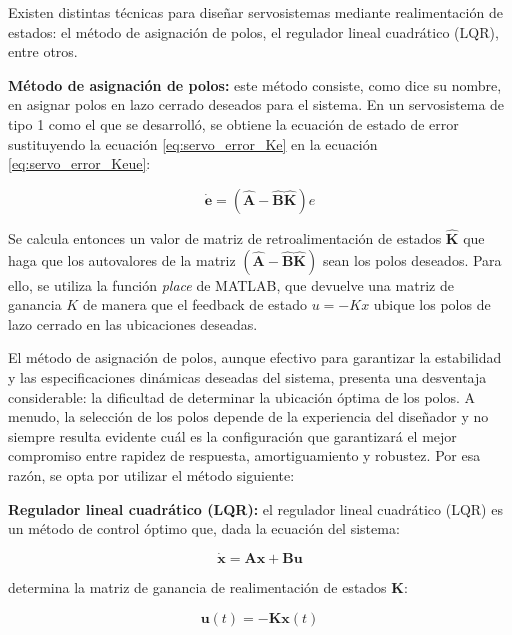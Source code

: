 Existen distintas técnicas para diseñar servosistemas mediante realimentación de estados: el método de asignación de polos,
el regulador lineal cuadrático (LQR), entre otros.

\textbf{Método de asignación de polos:} este método consiste, como dice su nombre, en asignar polos en lazo cerrado deseados para el sistema.
En un servosistema de tipo 1 como el que se desarrolló, se obtiene la ecuación de estado de error sustituyendo
la ecuación \ref{eq:servo_error_Ke} en la ecuación \ref{eq:servo_error_Keue}:

\vspace{-0.5cm}
\begin{equation}
    \dot{\textbf{e}} = (\mathbf{\hat{A}} - \mathbf{\hat{B}} \mathbf{\hat{K}}) e
\end{equation}

Se calcula entonces un valor de matriz de retroalimentación de estados $\mathbf{\hat{K}}$ que haga que los autovalores
de la matriz $(\mathbf{\hat{A}} - \mathbf{\hat{B}} \mathbf{\hat{K}})$ sean los polos deseados. Para ello, se utiliza la función
\textit{place} de MATLAB, que devuelve una matriz de ganancia $\mathit{K}$ de manera que el feedback de estado $\mathit{u = -Kx}$ ubique los polos
de lazo cerrado en las ubicaciones deseadas.\parencite{MATLAB_place}

El método de asignación de polos, aunque efectivo para garantizar la estabilidad y las especificaciones dinámicas deseadas del sistema, presenta una
desventaja considerable: la dificultad de determinar la ubicación óptima de los polos. A menudo, la selección de los polos depende de la experiencia
del diseñador y no siempre resulta evidente cuál es la configuración que garantizará el mejor compromiso entre rapidez de respuesta, amortiguamiento
y robustez.\parencite{OGATA} Por esa razón, se opta por utilizar el método siguiente:

\textbf{Regulador lineal cuadrático (LQR):} el regulador lineal cuadrático (LQR) es un método de control óptimo que, dada la ecuación del sistema:

\vspace{-0.5cm}
\begin{equation}
    \dot{\textbf{x}} = \textbf{A} \textbf{x} + \textbf{B} \textbf{u}
\end{equation}

determina la matriz de ganancia de realimentación de estados $\textbf{K}$:

\vspace{-0.5cm}
\begin{equation}
   \textbf{u}(t) = -\textbf{K} \textbf{x}(t)
\end{equation}

